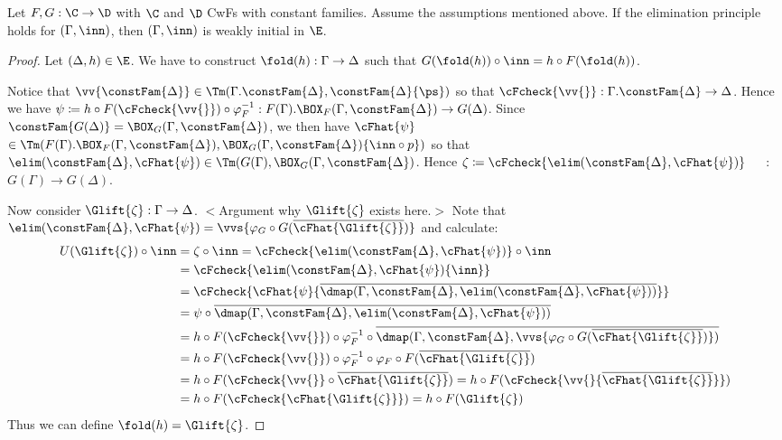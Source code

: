 \documentclass{article}
\begin{document}
\begin{theorem}
  Let $F, G : \C \to \D$ with $\C$ and $\D$ CwFs with constant
  families. Assume the assumptions mentioned above. If the elimination
  principle holds for $(\Gamma, \inn)$, then $(\Gamma, \inn)$ is weakly initial
  in $\E$.
\end{theorem}
\begin{proof}
  Let $(\Delta, h) \in \E$. We have to construct $\fold(h) : \Gamma \to
  \Delta$ such that $G(\fold(h)) \circ \inn = h \circ F(\fold(h))$.
  
  Notice that $\vv{\constFam{\Delta}} \in
  \Tm(\Gamma.\constFam{\Delta}, \constFam{\Delta}\{\ps\})$ so that
  $\cFcheck{\vv{}} : \Gamma.\constFam{\Delta} \to \Delta$. Hence we
  have $\psi \coloneqq h \circ F(\cFcheck{\vv{}}) \circ \varphi_F^{-1}
  : F(\Gamma).\BOX_F(\Gamma, \constFam{\Delta}) \to G(\Delta)$. Since
  $\constFam{G(\Delta)} = \BOX_G(\Gamma, \constFam{\Delta})$, we then
  have $\cFhat{\psi}$ $\in \Tm(F(\Gamma).\BOX_F(\Gamma,
  \constFam{\Delta}), \BOX_G(\Gamma, \constFam{\Delta})\{\inn \circ
  p\})$ so that $\elim(\constFam{\Delta}, \cFhat{\psi}) \in
  \Tm(G(\Gamma), \BOX_G(\Gamma, \constFam{\Delta})$. Hence
  $\zeta \coloneqq \cFcheck{\elim(\constFam{\Delta}, \cFhat{\psi})}$\ \ \ $:$ $G(\Gamma) \to
  G(\Delta)$.

  Now consider $\Glift{\zeta} : \Gamma \to \Delta$. $<$Argument why
  $\Glift{\zeta}$ exists here.$>$ Note that $\elim(\constFam{\Delta}, \cFhat{\psi}) = \vvs\{\varphi_G \circ G(\overline{\cFhat{\Glift{\zeta}}})\}$ and calculate:
  \begin{align*}
    U(\Glift{\zeta}) \circ \inn
    &= \zeta \circ \inn = \cFcheck{\elim(\constFam{\Delta}, \cFhat{\psi})} \circ \inn \\
    &= \cFcheck{\elim(\constFam{\Delta}, \cFhat{\psi})\{\inn\}} \\
    &= \cFcheck{\cFhat{\psi}\{\overline{\dmap(\Gamma, \constFam{\Delta}, \elim(\constFam{\Delta}, \cFhat{\psi}))}\}} \\
    &= \psi \circ \overline{\dmap(\Gamma, \constFam{\Delta}, \elim(\constFam{\Delta}, \cFhat{\psi}))} \\
    &= h \circ F(\cFcheck{\vv{}}) \circ \varphi_F^{-1} \circ \overline{\dmap(\Gamma, \constFam{\Delta}, \vvs\{\varphi_G \circ G(\overline{\cFhat{\Glift{\zeta}}})\})} \\
    &= h \circ F(\cFcheck{\vv{}}) \circ \varphi_F^{-1} \circ \varphi_F \circ F(\overline{\cFhat{\Glift{\zeta}}}) \\
    &= h \circ F(\cFcheck{\vv{}} \circ \overline{\cFhat{\Glift{\zeta}}}) 
    = h \circ F(\cFcheck{\vv{}\{\overline{\cFhat{\Glift{\zeta}}}\}}) \\
    &= h \circ F(\cFcheck{\cFhat{\Glift{\zeta}}})
    = h \circ F(\Glift{\zeta}) \\
  \end{align*}
Thus we can define $\fold(h) = \Glift{\zeta}$.
\end{proof}




\end{document}
